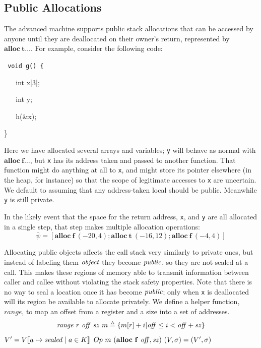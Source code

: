 \documentclass[10pt,conference]{ieeetran}%
\theoremstyle{definition}
\begin{document}
\subsection{Public Allocations}

The advanced machine supports public stack allocations that can
be accessed by anyone until they are deallocated on their owner's return,
represented by \(\mathbf{alloc} ~ \mathbf{t} \dots\).
For example, consider the following code:

{\tt
  void g() \{

  ~ ~ int x[3];

  ~ ~ int y;

  ~ ~ h(\&x);
    
  \}
}

Here we have allocated several arrays and variables; {\tt y}
will behave as normal with \(\mathbf{alloc} ~ \mathbf{f} \dots\), but
{\tt x} has its address taken and passed to another function. That
function might do anything at all to {\tt x}, and might store its pointer
elsewhere (in the heap, for instance) so that the scope of legitimate accesses
to {\tt x} are uncertain. We default to assuming that any address-taken local
should be public. Meanwhile {\tt y} is still private.

In the likely event that the space for the return address, {\tt x}, and {\tt y}
are all allocated in a single step, that step makes multiple allocation operations:
\[\bar{\psi} = [\mathbf{alloc} ~ \mathbf{f} ~ (-20,4);
 \mathbf{alloc} ~ \mathbf{t} ~ (-16,12) ; \mathbf{alloc} ~ \mathbf{f} ~ (-4,4)]\]

Allocating public objects affects the call stack very similarly to private ones,
but instead of labeling them \(\mathit{object}\) they become \(\mathit{public}\), so they are
not sealed at a call. This makes these
regions of memory able to transmit information between caller and callee without
violating the stack safety properties. Note that there is no way to seal a location
once it has become \(\mathit{public}\); only when {\tt x} is deallocated will its region
be available to allocate privately. We define a helper function, \(\mathit{range}\),
to map an offset from a register and a size into a set of addresses.
%
\[\mathit{range} ~ r ~ \mathit{off} ~ \mathit{sz} ~ m \triangleq
\{m[r]+i | \mathit{off} \leq i < \mathit{off+sz}\}\]
%
           {\(V' = V \llbracket a \mapsto \mathit{sealed} \mid a \in K \rrbracket\)}
           {\(Op ~ m ~ (\mathbf{alloc} ~ \mathbf{f} ~ \mathit{off, sz}) ~ (V,\sigma) = (V',\sigma)\)}
\end{document}
